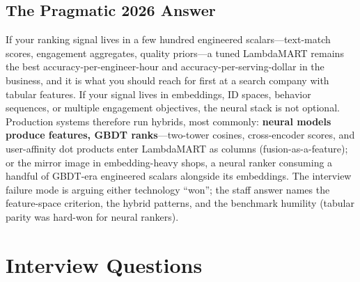 \subsection{The Pragmatic 2026 Answer}

\begin{keyinsight}
If your ranking signal lives in a few hundred engineered scalars---text-match scores, engagement aggregates, quality priors---a tuned LambdaMART remains the best accuracy-per-engineer-hour and accuracy-per-serving-dollar in the business, and it is what you should reach for first at a search company with tabular features. If your signal lives in embeddings, ID spaces, behavior sequences, or multiple engagement objectives, the neural stack is not optional. Production systems therefore run hybrids, most commonly: \textbf{neural models produce features, GBDT ranks}---two-tower cosines, cross-encoder scores, and user-affinity dot products enter LambdaMART as columns (fusion-as-a-feature); or the mirror image in embedding-heavy shops, a neural ranker consuming a handful of GBDT-era engineered scalars alongside its embeddings. The interview failure mode is arguing either technology ``won''; the staff answer names the feature-space criterion, the hybrid patterns, and the benchmark humility (tabular parity was hard-won for neural rankers).
\end{keyinsight}

\section{Interview Questions}
\label{sr:sec:ltr_interview}

